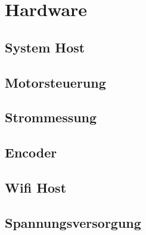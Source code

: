 \chapter{Hardware}
\label{ch:HW}

\section{System Host}
\label{sec:HW_systemhost}

\section{Motorsteuerung}
\label{sec:HW_motorsteuerung}		

\section{Strommessung}
\label{sec:HW_strommessung}

\section{Encoder}
\label{sec:HW_encoder}

\section{Wifi Host}
\label{sec:HW_wifihost}

\section{Spannungsversorgung}
\label{sec:HW_spannungsversorgung}	
		
	